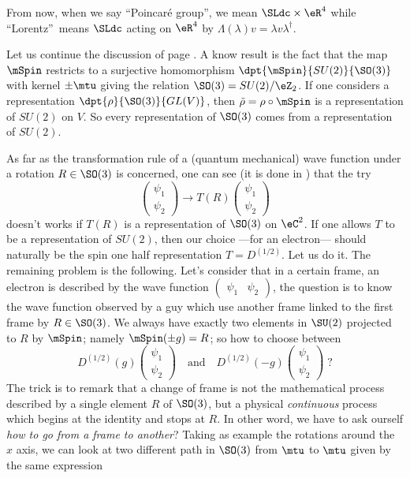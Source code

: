 From now, when we say ``Poincaré group'', we mean $\SLdc\times\eR^4$ while  ``Lorentz''\ means $\SLdc$ acting on $\eR^4$ by $\Lambda(\lambda)v=\lambda v\lambda^{\dag}$.

Let us continue the discussion of page \pageref{pg:reprez_SOt}. A know result is the fact that the map $\mSpin$ restricts to a surjective homomorphism $\dpt{\mSpin}{SU(2)}{\SO(3)}$ with kernel $\pm\mtu$ giving the relation $\SO(3)=SU(2)/\eZ_2$. If one considers a representation $\dpt{\rho}{\SO(3)}{GL(V)}$, then $\tilde\rho=\rho\circ\mSpin$ is a representation of $SU(2)$ on $V$. So every representation of $\SO(3)$ comes from a representation of $SU(2)$.

As far as the transformation rule of a (quantum mechanical) wave function under a rotation $R\in \SO(3)$ is concerned, one can see (it is done in \cite{Naber}) that the try
\[
   \begin{pmatrix}
     \psi_1\\
     \psi_2
   \end{pmatrix}\to
T(R)
\begin{pmatrix}
     \psi_1\\
     \psi_2
   \end{pmatrix}
\]
doesn't works if $T(R)$ is a representation of $\SO(3)$ on $\eC^2$. If one allows $T$ to be a representation of $SU(2)$, then our choice ---for an electron--- should naturally be the spin one half representation $T=D^{(1/2)}$. Let us do it. The remaining problem is the following. Let's consider that in a certain frame, an electron is described by the wave function $\begin{pmatrix} \psi_1&\psi_2\end{pmatrix}$, the question is to know the wave function observed by a guy which use another frame linked to the first frame by $R\in \SO(3)$. We always have exactly two elements in $\SU(2)$ projected to $R$ by $\mSpin$; namely $\mSpin(\pm g)=R$; so how to choose between
\[
   D^{(1/2)}(g)
\begin{pmatrix}
     \psi_1\\
     \psi_2
   \end{pmatrix}
\quad\text{and}\quad
   D^{(1/2)}(-g)
\begin{pmatrix}
     \psi_1\\
     \psi_2
   \end{pmatrix}\; ?
\]
The trick is to remark that a change of frame is not the mathematical process described by a single element $R$ of $\SO(3)$, but a physical \emph{continuous} process which begins at the identity and stops at $R$. In other word, we have to ask ourself \emph{how to go from a frame to another}? Taking as example the rotations around the $x$ axis, we can look at two different path in $\SO(3)$ from $\mtu$ to $\mtu$ given by the same expression
